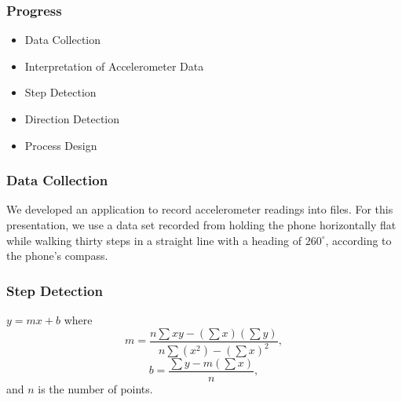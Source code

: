 \documentclass{beamer}
\begin{document}
\begin{frame}
  \frametitle{Progress}
  \begin{itemize}
  \item Data Collection
  \item Interpretation of Accelerometer Data
  \item Step Detection
  \item Direction Detection
  \item Process Design
  \end{itemize}
\end{frame}

\begin{frame}
  \frametitle{Data Collection}
  We developed an application to record accelerometer readings into
  files. For this presentation, we use a data set recorded from
  holding the phone horizontally flat while walking thirty steps in a
  straight line with a heading of $260^{\circ}$, according to the
  phone's compass.
\end{frame}

\begin{frame}
  \frametitle{Step Detection}
  $y = mx + b$ where
  \[
  m = \frac{n\sum{xy} - \left(\sum{x}\right)\left(\sum{y}\right)}
  {n\sum{(x^2)} - \left(\sum{x}\right)^2},
  \]
  \[
  b = \frac{\sum{y} - m\left(\sum{x}\right)}{n},
  \] and $n$ is the number of points.
\end{frame}

\end{document}

